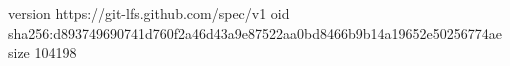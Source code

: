 version https://git-lfs.github.com/spec/v1
oid sha256:d893749690741d760f2a46d43a9e87522aa0bd8466b9b14a19652e50256774ae
size 104198
